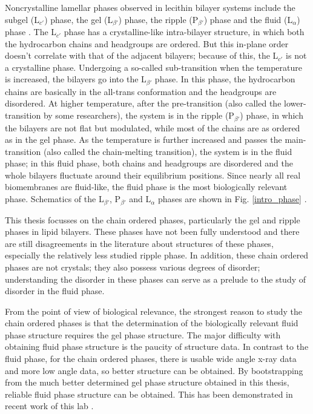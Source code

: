 Noncrystalline lamellar phases observed in lecithin bilayer systems
include the subgel (L$_{c '}$) phase, the gel (L$_{\beta '}$) phase,
the ripple (P$_{\beta '}$) phase and the fluid (L$_{\alpha}$) phase
\cite{Sma86}. The L$_{c '}$ phase has a crystalline-like intra-bilayer 
structure, in which both the hydrocarbon chains and headgroups are 
ordered. But this in-plane order doesn't correlate with that of the 
adjacent bilayers; because of this, the  L$_{c '}$ is not a crystalline 
phase. Undergoing a so-called sub-transition when the temperature is 
increased, the bilayers go into the L$_{\beta '}$ phase. In this phase, 
the hydrocarbon chains are basically in the all-trans conformation and 
the headgroups are disordered. At higher temperature, after the 
pre-transition (also called the lower-transition by some researchers), 
the system is in the ripple (P$_{\beta '}$) phase, in which the bilayers 
are not flat but modulated, while most of the chains are as ordered
as in the gel phase. As the temperature is further increased and 
passes the main-transition (also called the chain-melting transition), 
the system is in the fluid phase; in this fluid phase, both chains and 
headgroups are disordered and the whole bilayers fluctuate around their 
equilibrium positions. Since nearly all real biomembranes are fluid-like, 
the fluid phase is the most biologically relevant phase.
Schematics of the L$_{\beta '}$, P$_{\beta '}$ and L$_{\alpha}$ phases
are shown in Fig. \ref{intro_phase} \cite{Sma86}.

This thesis focusses on the chain ordered phases, particularly the gel and 
ripple phases in lipid bilayers. 
These phases have not been fully understood and there are still 
disagreements in the literature about structures of these phases, 
especially the relatively less studied ripple phase. In addition, these 
chain ordered phases are not crystals; they also possess various degrees 
of disorder; understanding the disorder in these phases can serve as 
a prelude to the study of disorder in the fluid phase.

From the point of view of biological relevance, the strongest reason to
study the chain ordered phases is that the determination of the
biologically relevant fluid phase structure requires the gel phase 
structure. The major difficulty with obtaining fluid phase structure
is the paucity of structure data. In contrast to the fluid phase,
for the chain ordered phases, there is usable wide angle x-ray data and
more low angle data, so better structure can be obtained. By bootstrapping
from the much better determined gel phase structure obtained in this
thesis, reliable fluid phase structure can be obtained. This has been 
demonstrated in recent work of this lab \cite{N96}.

